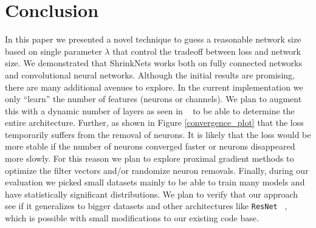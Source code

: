 \documentclass[sigconf]{acmart}
\begin{document}
\section{Conclusion}

In this paper we presented a novel technique to guess a reasonable network size
based on single parameter $\lambda$ that control the tradeoff between loss and
network size. We demonstrated that ShrinkNets works both on fully connected networks and
convolutional neural networks.  Although the initial results are promising,
there are many additional avenues to explore. In the current implementation we only
``learn'' the number of features (neurons or channels). We plan to augment
this with a dynamic number of layers as seen in ~\cite{meier} to be able to
determine the entire architecture. Further, as shown in Figure \ref{convergence_plot}
that the loss temporarily suffers from the removal of neurons. It is likely
that the loss would be more stable if the number of neurons converged faster or
neurons disappeared more slowly. For this reason we plan to explore proximal
gradient methods to optimize the filter vectors and/or randomize neuron
removals. Finally, during our evaluation we picked small datasets mainly to be able
to train many models and have statistically significant distributions. We 
plan to verify that our approach
 see if it generalizes to bigger
datasets and other architectures like \texttt{ResNet} ~\cite{He2016}, which is possible
with small
modifications to our existing code base.



\end{document}
